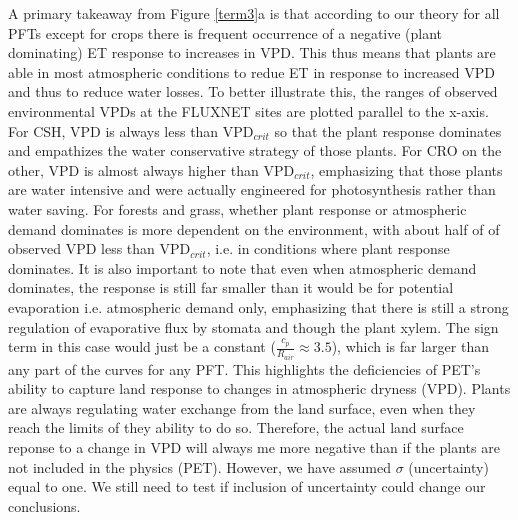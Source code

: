 \documentclass[draft,linenumbers]{agujournal}
\begin{document}
A primary takeaway from Figure \ref{term3}a is that according to our theory for all PFTs except for crops there is frequent occurrence of a negative (plant dominating) ET response to increases in VPD. This thus means that plants are able in most atmospheric conditions to redue ET in response to increased VPD and thus to reduce water losses. To better illustrate this, the ranges of observed environmental VPDs at the FLUXNET sites are plotted parallel to the x-axis. For CSH, VPD is always less than VPD$_{crit}$ so that the plant response dominates and empathizes the water conservative strategy of those plants. For CRO on the other, VPD is almost always higher than VPD$_{crit}$, emphasizing that those plants are water intensive and were actually engineered for photosynthesis rather than water saving. For forests and grass, whether plant response or atmospheric demand dominates is more dependent on the environment, with about half of of observed VPD less than VPD$_{crit}$, i.e. in conditions where plant response dominates. It is also important to note that even when atmospheric demand dominates, the response is still far smaller than it would be for potential evaporation i.e. atmospheric demand only, emphasizing that there is still a strong regulation of evaporative flux by stomata and though the plant xylem. The sign term in this case would just be a constant ($\frac{c_p}{R_{air}} \approx 3.5$), which is far larger than any part of the curves for any PFT. This highlights the deficiencies of PET's ability to capture land response to changes in atmospheric dryness (VPD). Plants are always regulating water exchange from the land surface, even when they reach the limits of they ability to do so. Therefore, the actual land surface reponse to a change in VPD will always me more negative than if the plants are not included in the physics (PET). However, we have assumed $\sigma$ (uncertainty) equal to one. We still need to test if inclusion of uncertainty could change our conclusions.
\end{document}
